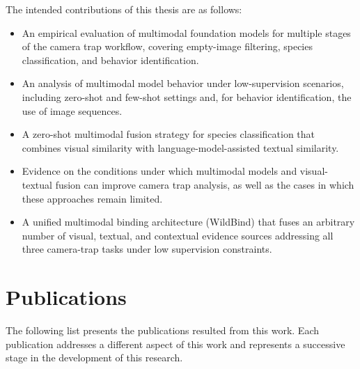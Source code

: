 The intended contributions of this thesis are as follows:

\begin{itemize}

\item An empirical evaluation of multimodal foundation models for multiple stages of the camera trap workflow, covering empty-image filtering, species classification, and behavior identification.

\item An analysis of multimodal model behavior under low-supervision scenarios, including zero-shot and few-shot settings and, for behavior identification, the use of image sequences.

\item A zero-shot multimodal fusion strategy for species classification that combines visual similarity with language-model-assisted textual similarity.

\item Evidence on the conditions under which multimodal models and visual-textual fusion can improve camera trap analysis, as well as the cases in which these approaches remain limited.

\item A unified multimodal binding architecture (WildBind) that fuses an arbitrary number of visual, textual, and contextual evidence sources addressing all three camera-trap tasks under low supervision constraints.

\end{itemize}

\section{Publications} 

The following list presents the publications resulted from this work. Each publication addresses a different aspect of this work and represents a successive stage in the development of this research.

